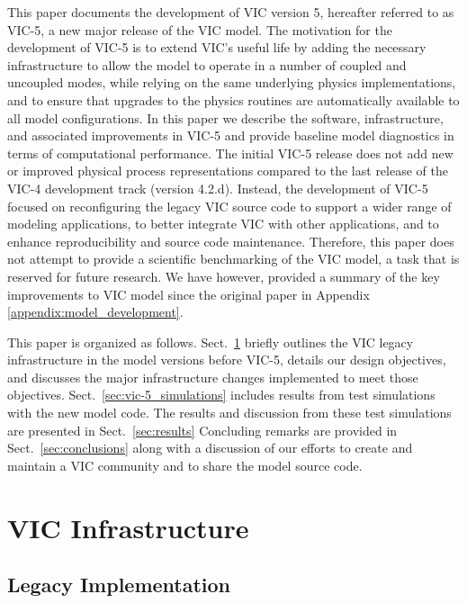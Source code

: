 \documentclass[gmd, manuscript]{copernicus}
\begin{document}
  This paper documents the development of VIC version 5, hereafter referred to as VIC-5, a new major release of the VIC model. The motivation for the development of VIC-5 is to extend VIC's useful life by adding the necessary infrastructure to allow the model to operate in a number of coupled and uncoupled modes, while relying on the same underlying physics implementations, and to ensure that upgrades to the physics routines are automatically available to all model configurations. In this paper we describe the software, infrastructure, and associated improvements in VIC-5 and provide baseline model diagnostics in terms of computational performance. The initial VIC-5 release does not add new or improved physical process representations compared to the last release of the VIC-4 development track (version 4.2.d). Instead, the development of VIC-5 focused on reconfiguring the legacy VIC source code to support a wider range of modeling applications, to better integrate VIC with other applications, and to enhance reproducibility and source code maintenance. Therefore, this paper does not attempt to provide a scientific benchmarking of the VIC model, a task that is reserved for future research. We have however, provided a summary of the key improvements to VIC model since the original \citet{Liang_1994} paper in Appendix \ref{appendix:model_development}.

  This paper is organized as follows. Sect.~\ref{sec:vic_infrastructure} briefly outlines the VIC legacy infrastructure in the model versions before VIC-5, details our design objectives, and discusses the major infrastructure changes implemented to meet those objectives. Sect.~\ref{sec:vic-5_simulations} includes results from test simulations with the new model code. The results and discussion from these test simulations are presented in Sect.~\ref{sec:results} Concluding remarks are provided in Sect.~\ref{sec:conclusions} along with a discussion of our efforts to create and maintain a VIC community and to share the model source code.

\section{VIC Infrastructure}
  \label{sec:vic_infrastructure}
  \subsection{Legacy Implementation}
    \label{sec:vic_legacy}
\end{document}
